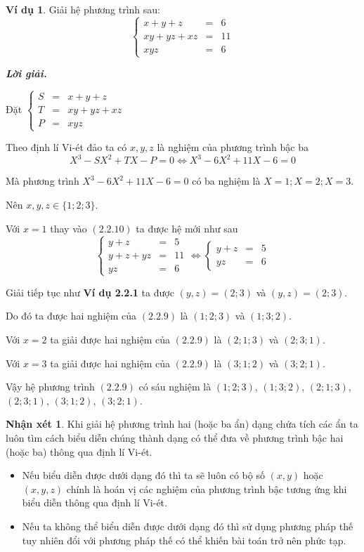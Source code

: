 \documentclass[12pt,a4paper,oneside]{book}
\theoremstyle{theorem}
\theoremstyle{definition}
\newtheorem{nx}[theorem2]{Nhận xét}
\newtheorem{vd}[theorem2]{Ví dụ}
\begin{document}
\begin{vd}
    Giải hệ phương trình sau: \begin{equation}
\left\{
\begin{array}{lcl}
x + y +z &=&6 \\
xy +yz+xz&=&11 \\
xyz &=&6
\end{array}
\right.
\end{equation}

\textbf{\textit{Lời giải.}}

Đặt $
\left\{
\begin{array}{lcl}
S &=& x + y +z \\
T&=&xy +yz+xz \\
 P&=&xyz
\end{array}
\right.$

Theo định lí Vi-ét đảo ta có $x,y,z$ là nghiệm của phương trình bậc ba \[X^3-SX^2+TX-P=0\Leftrightarrow X^3-6X^2+11X-6=0\]

Mà phương trình $X^3-6X^2+11X-6=0$ có ba nghiệm là $X=1;X=2;X=3$.

Nên $x,y,z \in \{1;2;3\}$.

Với $x=1$ thay vào $(2.2.10)$ ta được hệ mới như sau
\[\left\{
\begin{array}{lcl}
y+z &=& 5 \\
y+z+yz&=&11 \\
 yz&=&6
\end{array}
\right.\Leftrightarrow\left\{
\begin{array}{lcl}
y+z &=& 5 \\
 yz&=&6
\end{array}
\right.\]

Giải tiếp tục như \textbf{Ví dụ 2.2.1} ta được $(y,z)=(2;3)$ và $(y,z)=(2;3)$.

Do đó ta được hai nghiệm của $(2.2.9)$ là $(1;2;3)$ và $(1;3;2)$.

Với $x=2$ ta giải được hai nghiệm của $(2.2.9)$ là $(2;1;3)$ và $(2;3;1)$.

Với $x=3$ ta giải được hai nghiệm của $(2.2.9)$ là $(3;1;2)$ và $(3;2;1)$.

Vậy hệ phương trình $(2.2.9)$ có sáu nghiệm là $(1;2;3)$, $(1;3;2)$, $(2;1;3)$, $(2;3;1)$, $(3;1;2)$, $(3;2;1)$.
\end{vd}

\begin{nx}
    Khi giải hệ phương trình hai (hoặc ba ẩn) dạng chứa tích các ẩn ta luôn tìm cách biểu diễn chúng thành dạng có thể đưa về phương trình bậc hai (hoặc ba) thông qua định lí Vi-ét. 
    \begin{itemize}
        \item Nếu biểu diễn được dưới dạng đó thì ta sẽ luôn có bộ số $(x,y)$ hoặc $(x,y,z)$ chính là hoán vị các nghiệm của phương trình bậc tương ứng khi biểu diễn thông qua định lí Vi-ét.
        \item Nếu ta không thể biểu diễn được dưới dạng đó thì sử dụng phương pháp thế tuy nhiên đổi với phương pháp thế có thể khiến bài toán trở nên phức tạp.
        
    \end{itemize}
\end{nx}
\end{document}
